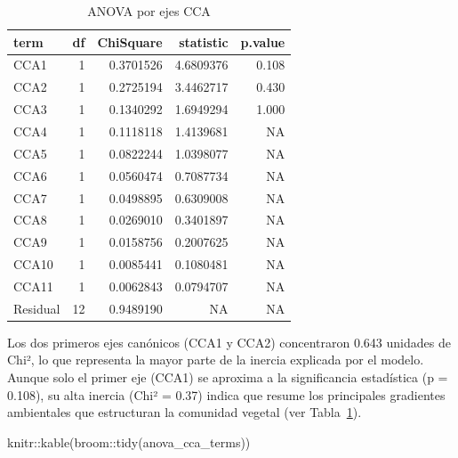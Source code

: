 \documentclass[
  spanish,
  11pt,
  a4paper,
  DIV=11,
  numbers=noendperiod]{scrartcl}
\newenvironment{Shaded}{\begin{snugshade}}{\end{snugshade}}
\newcommand{\FunctionTok}[1]{\textcolor[rgb]{0.28,0.35,0.67}{#1}}
\newcommand{\NormalTok}[1]{\textcolor[rgb]{0.00,0.23,0.31}{#1}}
\newcommand{\SpecialCharTok}[1]{\textcolor[rgb]{0.37,0.37,0.37}{#1}}
\begin{document}
\begin{longtable}[]{@{}lrrrr@{}}

\caption{\label{tbl-anova-ejes-cca}ANOVA por ejes CCA}

\tabularnewline

\toprule\noalign{}
term & df & ChiSquare & statistic & p.value \\
\midrule\noalign{}
\endhead
\bottomrule\noalign{}
\endlastfoot
CCA1 & 1 & 0.3701526 & 4.6809376 & 0.108 \\
CCA2 & 1 & 0.2725194 & 3.4462717 & 0.430 \\
CCA3 & 1 & 0.1340292 & 1.6949294 & 1.000 \\
CCA4 & 1 & 0.1118118 & 1.4139681 & NA \\
CCA5 & 1 & 0.0822244 & 1.0398077 & NA \\
CCA6 & 1 & 0.0560474 & 0.7087734 & NA \\
CCA7 & 1 & 0.0498895 & 0.6309008 & NA \\
CCA8 & 1 & 0.0269010 & 0.3401897 & NA \\
CCA9 & 1 & 0.0158756 & 0.2007625 & NA \\
CCA10 & 1 & 0.0085441 & 0.1080481 & NA \\
CCA11 & 1 & 0.0062843 & 0.0794707 & NA \\
Residual & 12 & 0.9489190 & NA & NA \\

\end{longtable}

Los dos primeros ejes canónicos (CCA1 y CCA2) concentraron 0.643
unidades de Chi², lo que representa la mayor parte de la inercia
explicada por el modelo. Aunque solo el primer eje (CCA1) se aproxima a
la significancia estadística (p = 0.108), su alta inercia (Chi² = 0.37)
indica que resume los principales gradientes ambientales que estructuran
la comunidad vegetal (ver Tabla~\ref{tbl-anova-ejes-cca}).

\begin{Shaded}
\begin{Highlighting}[numbers=left,,]
\NormalTok{knitr}\SpecialCharTok{::}\FunctionTok{kable}\NormalTok{(broom}\SpecialCharTok{::}\FunctionTok{tidy}\NormalTok{(anova\_cca\_terms))}
\end{Highlighting}
\end{Shaded}
\end{document}
